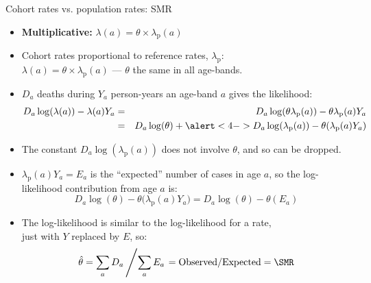 \begin{frame}{Cohort rates vs. population rates: SMR}
  \begin{itemize}[<+->]
  \item \textbf{Multiplicative:} $\lambda(a) = \theta \times \lambda_\text{p}(a)$
  \item Cohort rates proportional to reference rates, $\lambda_\text{p}$:\\
    $\lambda(a) = \theta \times \lambda_\text{p}(a)$ --- $\theta$ the same in all
    age-bands.
  \item $D_a$ deaths during $Y_a$ person-years an age-band $a$ gives
    the likelihood:
 \begin{eqnarray*}
    D_a \log(\lambda(a)) - \lambda(a) Y_a
  & = & D_a \log(\theta\lambda_\text{p}(a)) - \theta\lambda_\text{p}(a) Y_a \\
  & = & D_a \log(\theta)+ \alert<4->{D_a \log(\lambda_\text{p}(a))} - \theta(\lambda_\text{p}(a) Y_a)
\end{eqnarray*}
\item The constant \alert<4->{$D_a \log(\lambda_\text{p}(a))$} does not involve $\theta$,
  and so can be dropped.
\end{itemize}
\end{frame}

\begin{frame}
  \begin{itemize}[<+->]
  \item $\lambda_\text{p}(a)Y_a = E_a$ is the ``expected'' number of cases in
    age $a$, so the log-likelihood contribution from age $a$ is:
\[
 D_a \log(\theta) - \theta\big(\lambda_\text{p}(a) Y_a\big) =
 D_a \log(\theta) - \theta(E_a)
\]
\item The log-likelihood is similar to the log-likelihood for a rate,\\
  just with $Y$ replaced by $E$, so:
\[
  \hat\theta = \sum_aD_a \left/ \sum_aE_a \right. =
  \mbox{Observed}/\mbox{Expected}
  = \SMR
\]
\end{itemize}
\end{frame}

